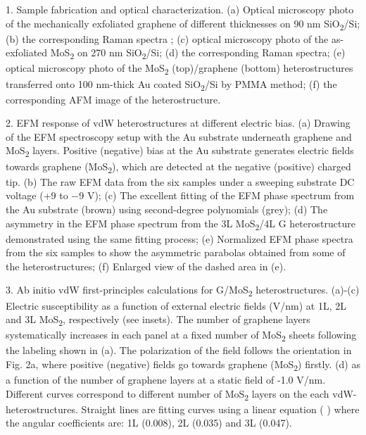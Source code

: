  
 1. Sample fabrication and optical characterization. (a) Optical microscopy photo of the mechanically exfoliated graphene of different thicknesses on 90 nm SiO\textsubscript{2}/Si; (b) the corresponding Raman spectra ; (c) optical microscopy photo of the as-exfoliated MoS\textsubscript{2} on 270 nm SiO\textsubscript{2}/Si; (d) the corresponding Raman spectra; (e) optical microscopy photo of the MoS\textsubscript{2} (top)/graphene (bottom) heterostructures transferred onto 100 nm-thick Au coated SiO\textsubscript{2}/Si by PMMA method; (f) the corresponding AFM image of the heterostructure.
 
 2. EFM response of vdW heterostructures at different electric bias. (a) Drawing of the EFM spectroscopy setup with the Au substrate underneath graphene and MoS\textsubscript{2} layers. Positive (negative) bias at the Au substrate generates electric fields towards graphene (MoS\textsubscript{2}), which are detected at the negative (positive) charged tip. (b) The raw EFM data from the six samples under a sweeping substrate DC voltage (+9 to −9 V); (c) The excellent fitting of the EFM phase spectrum from the Au substrate (brown) using second-degree polynomials (grey); (d) The asymmetry in the EFM phase spectrum from the 3L MoS\textsubscript{2}/4L G heterostructure demonstrated using the same fitting process; (e) Normalized EFM phase spectra from the six samples to show the asymmetric parabolas obtained from some of the heterostructures; (f) Enlarged view of the dashed area in (e).
 
 3. Ab initio vdW first-principles calculations for G/MoS\textsubscript{2} heterostructures. (a)-(c) Electric susceptibility   as a function of external electric fields (V/nm) at 1L, 2L and 3L MoS\textsubscript{2}, respectively (see insets). The number of graphene layers systematically increases in each panel at a fixed number of MoS\textsubscript{2} sheets following the labeling shown in (a). The polarization of the field follows the orientation in Fig. 2a, where positive (negative) fields go towards graphene (MoS\textsubscript{2}) firstly.  (d)   as a function of the number of graphene layers at a static field of -1.0 V/nm. Different curves correspond to different number of MoS\textsubscript{2} layers on the each vdW-heterostructures. Straight lines are fitting curves using a linear equation ( ) where the angular coefficients   are: 1L (0.008), 2L (0.035) and 3L (0.047).  
 
